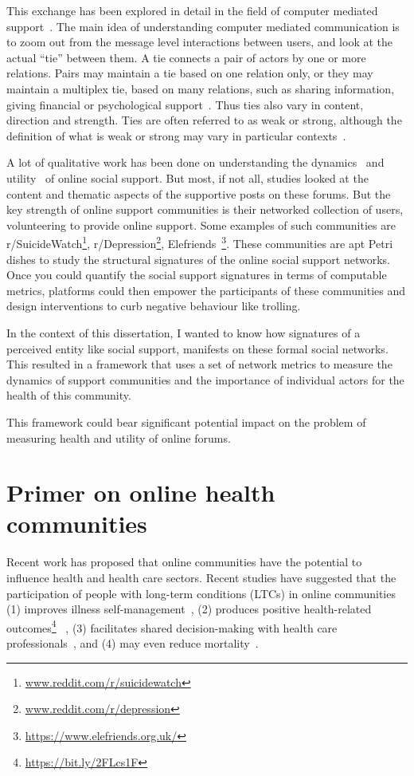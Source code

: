 This exchange has been explored in detail in the field of computer mediated support~\cite{coulson2005receiving,weinberg1995computer}. The main idea of understanding computer mediated communication is to zoom out from the message level interactions between users, and look at the actual ``tie'' between them. A tie connects a pair of actors by one or more relations. Pairs may maintain a tie based on one relation only, or they may maintain a multiplex tie, based on many relations, such as sharing information, giving financial or psychological support~\cite{garton1997studying}. Thus ties also vary in content, direction and strength. Ties are often referred to as weak or strong, although the definition of what is weak or strong may vary in particular contexts~\cite{marsden1984measuring}. 

A lot of qualitative work has been done on understanding the dynamics~\cite{wright2003health,languageChoudhury} and utility~\cite{nambisan2011information} of online social support. But most, if not all, studies looked at the content and thematic aspects of the supportive posts on these forums. But the key strength of online support communities is their networked collection of users, volunteering to provide online support. Some examples of such communities are  r/SuicideWatch\footnote{\url{www.reddit.com/r/suicidewatch}}, r/Depression\footnote{\url{www.reddit.com/r/depression}}, Elefriends~\footnote{\url{https://www.elefriends.org.uk/}}. These communities are apt Petri dishes to study the structural signatures of the online social support networks. Once you could quantify the social support signatures in terms of computable metrics, platforms could then empower the participants of these communities and design interventions to curb negative behaviour like trolling.

In the context of this dissertation, I wanted to know how signatures of a perceived entity like social support,  manifests on these formal social networks.
This resulted in a framework that uses a set of network metrics to measure the dynamics of support communities and the importance of individual actors for the health of this community. 

This framework could bear significant potential impact on the problem of measuring health and utility of online forums. 

\section{Primer on online health communities}
\label{sec:primer}
Recent work has proposed that online communities have the potential to influence health and health care sectors. Recent studies have suggested that the participation of people with long-term conditions (LTCs) in online communities (1) improves illness self-management~\cite{allen2016long}, (2) produces positive health-related outcomes\footnote{\url{https://bit.ly/2FLcs1F}}~\cite{mo2012developing,pendry2015individual} , (3) facilitates shared decision-making with health care professionals~\cite{bartlett2011investigation,izuka2017stroke}, and (4) may even reduce mortality~\cite{hobbs2016online}.

